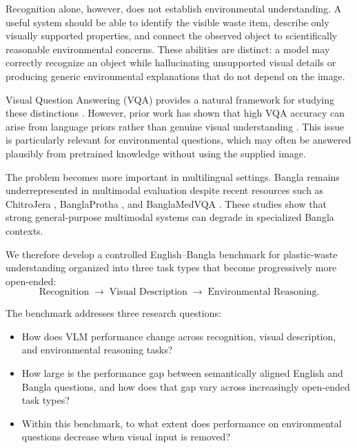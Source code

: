 \documentclass{article}
\begin{document}
Recognition alone, however, does not establish environmental understanding. A useful system should be able to identify the visible waste item, describe only visually supported properties, and connect the observed object to scientifically reasonable environmental concerns. These abilities are distinct: a model may correctly recognize an object while hallucinating unsupported visual details or producing generic environmental explanations that do not depend on the image.

Visual Question Answering (VQA) provides a natural framework for studying these distinctions \citep{antol2015vqa}. However, prior work has shown that high VQA accuracy can arise from language priors rather than genuine visual understanding \citep{goyal2017makingv}. This issue is particularly relevant for environmental questions, which may often be answered plausibly from pretrained knowledge without using the supplied image.

The problem becomes more important in multilingual settings. Bangla remains underrepresented in multimodal evaluation despite recent resources such as ChitroJera \citep{barua2024chitrojera}, BanglaProtha \citep{fahim2026banglaprotha}, and BanglaMedVQA \citep{ahmed2026banglamedvqa}. These studies show that strong general-purpose multimodal systems can degrade in specialized Bangla contexts.

We therefore develop a controlled English--Bangla benchmark for plastic-waste understanding organized into three task types that become progressively more open-ended:
\begin{equation}
\text{Recognition}
\;\longrightarrow\;
\text{Visual Description}
\;\longrightarrow\;
\text{Environmental Reasoning}.
\label{eq:reasoning_hierarchy}
\end{equation}

The benchmark addresses three research questions:
\begin{itemize}
    \item[\textbf{RQ1.}] How does VLM performance change across recognition, visual description, and environmental reasoning tasks?
    \item[\textbf{RQ2.}] How large is the performance gap between semantically aligned English and Bangla questions, and how does that gap vary across increasingly open-ended task types?
    \item[\textbf{RQ3.}] Within this benchmark, to what extent does performance on environmental questions decrease when visual input is removed?
\end{itemize}
\end{document}
